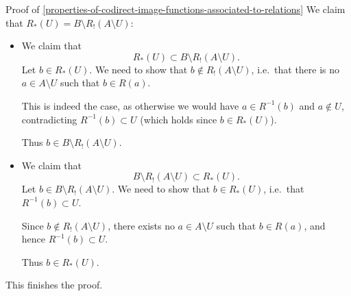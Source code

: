\begin{Proof}{Proof of \cref{properties-of-codirect-image-functions-associated-to-relations}}
    We claim that $R_{*}(U)=B\setminus R_{!}(A\setminus U)$:
    \begin{itemize}
        \item{}We claim that
            \[
                R_{*}(U)%
                \subset%
                B\setminus R_{!}(A\setminus U).%
            \]%
            Let $b\in R_{*}(U)$. We need to show that $b\nin R_{!}(A\setminus U)$, i.e.\ that there is no $a\in A\setminus U$ such that $b\in R(a)$.

            This is indeed the case, as otherwise we would have $a\in R^{-1}(b)$ and $a\nin U$, contradicting $R^{-1}(b)\subset U$ (which holds since $b\in R_{*}(U)$).

            Thus $b\in B\setminus R_{!}(A\setminus U)$.
        \item{}We claim that
            \[
                B\setminus R_{!}(A\setminus U)%
                \subset%
                R_{*}(U).%
            \]%
            Let $b\in B\setminus R_{!}(A\setminus U)$. We need to show that $b\in R_{*}(U)$, i.e.\ that $R^{-1}(b)\subset U$.

            Since $b\nin R_{!}(A\setminus U)$, there exists no $a\in A\setminus U$ such that $b\in R(a)$, and hence $R^{-1}(b)\subset U$.

            Thus $b\in R_{*}(U)$.
    \end{itemize}
    This finishes the proof.
\end{Proof}
